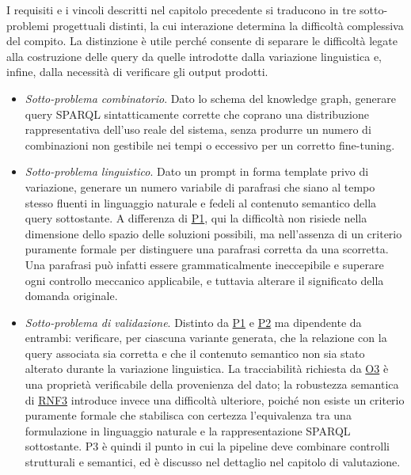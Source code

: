 \documentclass[12pt,a4paper,openright,twoside]{book}
\begin{document}
I requisiti e i vincoli descritti nel capitolo precedente si traducono in tre
sotto-problemi progettuali distinti, la cui interazione determina la difficoltà
complessiva del compito. La distinzione è utile perché consente di separare le
difficoltà legate alla costruzione delle query da quelle introdotte dalla
variazione linguistica e, infine, dalla necessità di verificare gli output
prodotti.

\begin{itemize}
    \item[\textbf{P1}]\label{prob:P1} \textit{Sotto-problema combinatorio}. Dato
          lo schema del knowledge graph, generare query SPARQL sintatticamente
          corrette che coprano una distribuzione rappresentativa dell'uso reale
          del sistema, senza produrre un numero di combinazioni non gestibile
          nei tempi o eccessivo per un corretto fine-tuning.

    \item[\textbf{P2}]\label{prob:P2} \textit{Sotto-problema linguistico}. Dato
          un prompt in forma template privo di variazione, generare un numero
          variabile di parafrasi che siano al tempo stesso fluenti in linguaggio
          naturale e fedeli al contenuto semantico della query sottostante. A
          differenza di \hyperref[prob:P1]{P1}, qui la difficoltà non risiede
          nella dimensione dello spazio delle soluzioni possibili, ma
          nell'assenza di un criterio puramente formale per distinguere una
          parafrasi corretta da una scorretta. Una parafrasi può infatti essere
          grammaticalmente ineccepibile e superare ogni controllo meccanico
          applicabile, e tuttavia alterare il significato della domanda
          originale.

    \item[\textbf{P3}]\label{prob:P3} \textit{Sotto-problema di validazione}.
          Distinto da \hyperref[prob:P1]{P1} e \hyperref[prob:P2]{P2} ma
          dipendente da entrambi: verificare, per ciascuna variante generata,
          che la relazione con la query associata sia corretta e che il
          contenuto semantico non sia stato alterato durante la variazione
          linguistica. La tracciabilità richiesta da \hyperref[obj:O3]{O3} è una
          proprietà verificabile della provenienza del dato; la robustezza
          semantica di \hyperref[rnf:RNF3]{RNF3} introduce invece una difficoltà
          ulteriore, poiché non esiste un criterio puramente formale che
          stabilisca con certezza l'equivalenza tra una formulazione in
          linguaggio naturale e la rappresentazione SPARQL sottostante. P3 è
          quindi il punto in cui la pipeline deve combinare controlli
          strutturali e semantici, ed è discusso nel dettaglio nel capitolo di
          valutazione.
\end{itemize}
\end{document}

